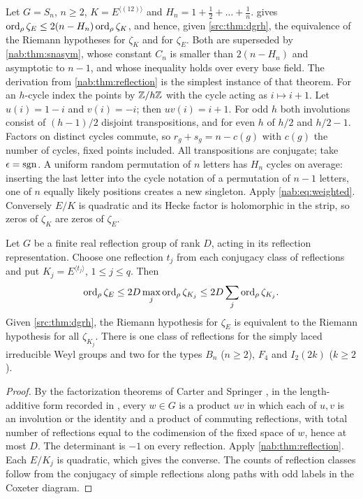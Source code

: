 \begin{remark}\label{nab:cor:sn}
Let $G=S_n$, $n\ge2$, $K=E^{\langle(12)\rangle}$ and $H_n=1+\tfrac12+\dots+\tfrac1n$.
 gives $\operatorname{ord}_\rho\zeta_E\le2(n-H_n)\operatorname{ord}_\rho\zeta_K$, and hence,
given \cref{src:thm:dgrh}, the equivalence of the Riemann hypotheses for $\zeta_K$ and for
$\zeta_E$. Both are superseded by \cref{nab:thm:snasym}, whose constant $C_n$ is smaller
than $2(n-H_n)$ and asymptotic to $n-1$, and whose inequality holds over every base
field. The derivation from \cref{nab:thm:reflection} is the simplest instance of that
theorem.
For an $h$-cycle index the points by $\mathbb{Z}/h\mathbb{Z}$ with the cycle acting as $i\mapsto i+1$. Let
$u(i)=1-i$ and $v(i)=-i$; then $uv(i)=i+1$. For odd $h$ both involutions consist of
$(h-1)/2$ disjoint transpositions, and for even $h$ of $h/2$ and $h/2-1$. Factors on
distinct cycles commute, so $r_g+s_g=n-c(g)$ with $c(g)$ the number of cycles, fixed points
included. All transpositions are conjugate; take $\epsilon=\operatorname{sgn}$. A uniform random
permutation of $n$ letters has $H_n$ cycles on average: inserting the last letter into the
cycle notation of a permutation of $n-1$ letters, one of $n$ equally likely positions
creates a new singleton. Apply \eqref{nab:eq:weighted}. Conversely $E/K$ is quadratic and
its Hecke factor is holomorphic in the strip, so zeros of $\zeta_K$ are zeros of $\zeta_E$.
\end{remark}

\begin{corollary}\label{nab:cor:coxeter}
Let $G$ be a finite real reflection group of rank $D$, acting in its reflection
representation. Choose one reflection $t_j$ from each conjugacy class of reflections and
put $K_j=E^{\langle t_j\rangle}$, $1\le j\le q$. Then
\[
 \operatorname{ord}_\rho\zeta_E\le2D\max_j\operatorname{ord}_\rho\zeta_{K_j}\le2D\sum_j\operatorname{ord}_\rho\zeta_{K_j} .
\]
Given \cref{src:thm:dgrh}, the Riemann hypothesis for $\zeta_E$ is equivalent to the
Riemann hypothesis for all $\zeta_{K_j}$. There is one class of reflections for the simply
laced irreducible Weyl groups and two for the types $B_n$ ($n\ge2$), $F_4$ and
$I_2(2k)$ ($k\ge2$).
\end{corollary}
\begin{proof}
By the factorization theorems of Carter and Springer \cite{Carter1972Conjugacy,Springer1974Regular}, in the length-additive form recorded in
\cite{BaumeisterDyerStumpWegener2017Hurwitz}, every $w\in G$ is a product $uv$ in which
each of $u,v$ is an involution or the identity and a product of commuting reflections,
with total number of reflections equal to the codimension of the fixed space of $w$, hence
at most $D$. The determinant is $-1$ on every reflection. Apply
\cref{nab:thm:reflection}. Each $E/K_j$ is quadratic, which gives the converse. The counts
of reflection classes follow from the conjugacy of simple reflections along paths with odd
labels in the Coxeter diagram.
\end{proof}


